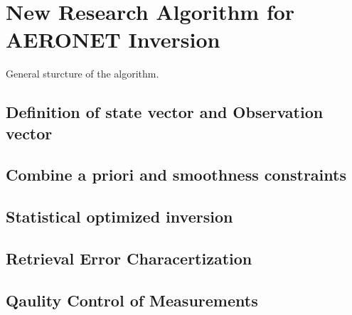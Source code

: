 \section{New Research Algorithm for AERONET Inversion}

General sturcture of the algorithm.

\subsection{Definition of state vector and Observation vector}
\subsection{Combine a priori and smoothness constraints}
\subsection{Statistical optimized inversion}
\subsection{Retrieval Error Characertization}
\subsection{Qaulity Control of Measurements}
